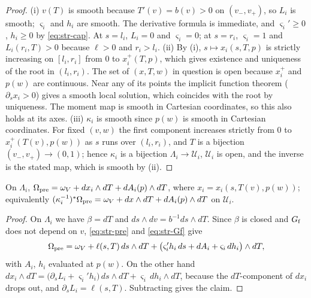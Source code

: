 \begin{proof}
(i) $v(T)$ is smooth because $T'(v)=b(v)>0$ on $(v_-,v_+)$, so $L_i$ is smooth; $\varsigma_i$ and $h_i$ are smooth. The derivative
formula is immediate, and $\varsigma_i'\ge0$, $h_i\ge0$ by \eqref{eq:str-cap}. At $s=l_i$, $L_i=0$ and $\varsigma_i=0$; at $s=r_i$,
$\varsigma_i=1$ and $L_i(r_i,T)>0$ because $\ell>0$ and $r_i>l_i$.
(ii) By (i), $s\mapsto x_i(s,T,p)$ is strictly increasing on $[l_i,r_i]$ from $0$ to $x_i^+(T,p)$, which gives existence and
uniqueness of the root in $(l_i,r_i)$. The set of $(x,T,w)$ in question is open because $x_i^+$ and $p(w)$ are continuous. Near any of its
points the implicit function theorem ($\partial_sx_i>0$) gives a smooth local solution, which coincides with the root by
uniqueness. The moment map is smooth in Cartesian coordinates, so this also holds at its axes.
(iii) $\kappa_i$ is smooth since $p(w)$ is smooth in Cartesian coordinates. For fixed $(v,w)$ the first component increases
strictly from $0$ to $x_i^+(T(v),p(w))$ as $s$ runs over $(l_i,r_i)$, and $T$ is a bijection $(v_-,v_+)\to(0,1)$; hence
$\kappa_i$ is a bijection $\Lambda_i\to\mathcal U_i$, $\mathcal U_i$ is open, and the inverse is the stated map, which is smooth
by (ii).
\end{proof}

\begin{lemma}\label{lem:str-layer-form}
On $\Lambda_i$, $\Omega_{\rm pre}=\omega_V+dx_i\wedge dT+dA_i(p)\wedge dT$, where $x_i=x_i(s,T(v),p(w))$; equivalently
$(\kappa_i^{-1})^*\Omega_{\rm pre}=\omega_V+dx\wedge dT+dA_i(p)\wedge dT$ on $\mathcal U_i$.
\end{lemma}

\begin{proof}
On $\Lambda_i$ we have $\beta=dT$ and $ds\wedge dv=b^{-1}ds\wedge dT$. Since $\beta$ is closed and $G_{\rm f}$ does not depend on
$v$, \eqref{eq:str-pre} and \eqref{eq:str-Gf} give
\[
 \Omega_{\rm pre}=\omega_V+\ell(s,T)\,ds\wedge dT+\big(\varsigma_i'h_i\,ds+dA_i+\varsigma_i\,dh_i\big)\wedge dT ,
\]
with $A_i$, $h_i$ evaluated at $p(w)$. On the other hand
$dx_i\wedge dT=\big(\partial_sL_i+\varsigma_i'h_i\big)\,ds\wedge dT+\varsigma_i\,dh_i\wedge dT$, because the $dT$-component of $dx_i$
drops out, and $\partial_sL_i=\ell(s,T)$. Subtracting gives the claim.
\end{proof}

